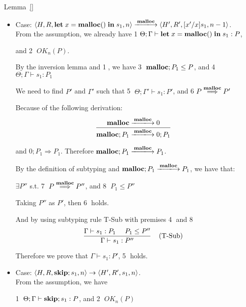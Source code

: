 \begin{pfof}{Lemma~\ref{}}
\begin{itemize}

\item Case: $\langle H, R, \LET x = \MALLOC \IN s_{1}, n \rangle \xlongrightarrow{\Malloc} \langle H', R', [x'/x]s_{1}, n - 1  \rangle $.\\

From the assumption, we already have \textcircled{1}$\Theta; \Gamma \vdash \mathbf{let}\; x = \mathbf{malloc()}\; \mathbf{in}\; s_{1} : P$,

and \textcircled{2} $OK_{n}(P)$.

By the inversion lemma and \textcircled{1}, we have \textcircled{3} $\mathbf{malloc};P_{1} \le P$, and \textcircled{4} $\Theta; \Gamma \vdash s_{1} : P_{1}$

We need to find $P'$ and $\Gamma'$ such that \textcircled{5} $\Theta; \Gamma' \vdash s_{1} : P'$, and \textcircled{6}$P \overset{\text{$\mathbf{malloc}$}}{\Longrightarrow} P'$

Because of the following derivation:
$$
  \frac{ \Malloc \xlongrightarrow{\Malloc} 0}
  {\Malloc;P_{1} \xlongrightarrow{\Malloc} 0;P_{1}}
$$

and $0;P_{1} \Rightarrow P_{1}$. Therefore $\Malloc;P_{1} \xlongrightarrow{\Malloc} P_{1}$.

By the definition of subtyping and $\Malloc;P_{1} \xlongrightarrow{\Malloc} P_{1}$, we have that:
\begin{center}
$\exists P''$ s.t. \textcircled{7} $P \overset{\text{$\mathbf{malloc}$}}{\Longrightarrow} P''$, and \textcircled{8} $P_{1} \le P''$
 \end{center}

Taking $P''$ as $P'$, then \textcircled{6} holds.

And by using subtyping rule T-Sub with premises \textcircled{4} and \textcircled{8}
$$
    \frac{\Gamma \vdash s_{1} : P_{1} \ \ \ \ P_{1} \le P''}
     {\Gamma \vdash s_{1} : P''}
     \; \; \; \; \mbox{(T-Sub)}
$$

Therefore we prove that $\Gamma \vdash s_{1} : P'$, \textcircled{5} holds.\\

\item Case: $\langle H, R, \mathbf{skip};s_{1}, n \rangle \rightarrow \langle H', R', s_{1}, n \rangle $. \\

From the assumption, we have
\begin{center}
\textcircled{1} $\Theta; \Gamma \vdash \mathbf{skip};s_{1} : P$, and \textcircled{2} $OK_{n}(P)$
\end{center}


\end{itemize}
\end{pfof}

